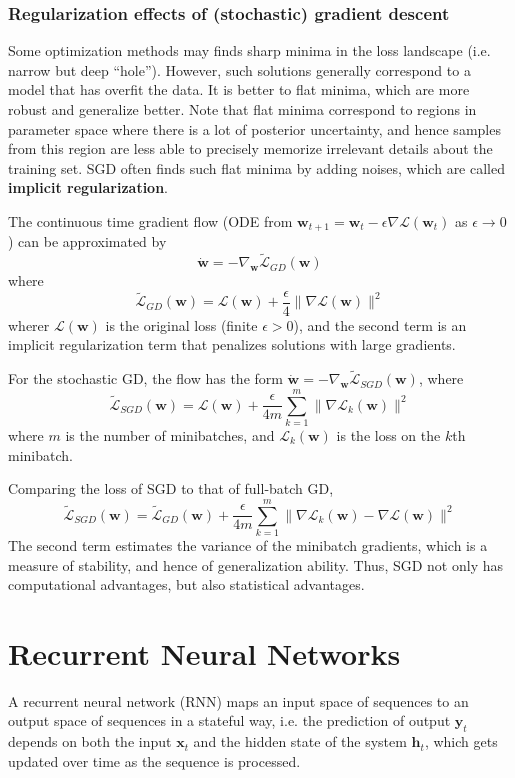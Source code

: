 \documentclass[11pt]{article}
\begin{document}
\subsubsection*{Regularization effects of (stochastic) gradient descent}

Some optimization methods may finds sharp minima in the loss landscape (i.e. narrow but deep ``hole''). 
However, such solutions generally correspond to a model that has overfit the data. 
It is better to flat minima, which are more robust and generalize better. 
Note that flat minima correspond to regions in parameter space where there is a lot of posterior uncertainty, and hence samples from this region are less able to precisely memorize irrelevant details about the training set.
SGD often finds such flat minima by adding noises, which are called \textbf{implicit regularization}.

The continuous time gradient flow (ODE from $\boldsymbol{w}_{t+1} = \boldsymbol{w}_{t} - \epsilon \nabla \mathcal{L}(\boldsymbol{w}_{t})$ as $\epsilon \to 0$) can be approximated by
\[
\dot{\boldsymbol{w}} = - \nabla_{\boldsymbol{w}} \tilde{\mathcal{L}}_{GD}(\boldsymbol{w})
\]
where
\[
\tilde{\mathcal{L}}_{GD}(\boldsymbol{w}) = \mathcal{L}(\boldsymbol{w}) + \frac{\epsilon}{4} \| \nabla \mathcal{L}(\boldsymbol{w}) \|^2
\]
wherer $\mathcal{L}(\boldsymbol{w})$ is the original loss (finite $\epsilon > 0$), and the second term is an implicit regularization term that penalizes solutions with large gradients.

For the stochastic GD, the flow has the form $\dot{\boldsymbol{w}} = - \nabla_{\boldsymbol{w}} \tilde{\mathcal{L}}_{SGD}(\boldsymbol{w})$, where 
\[
\tilde{\mathcal{L}}_{SGD}(\boldsymbol{w}) = \mathcal{L}(\boldsymbol{w}) + \frac{\epsilon}{4m} \sum_{k=1}^{m} \| \nabla \mathcal{L}_k(\boldsymbol{w}) \|^2
\]
where $m$ is the number of minibatches, and $\mathcal{L}_k(\boldsymbol{w})$ is the loss on the $k$th minibatch.

Comparing the loss of SGD to that of full-batch GD, 
\[
\tilde{\mathcal{L}}_{SGD}(\boldsymbol{w}) = \tilde{\mathcal{L}}_{GD}(\boldsymbol{w}) + \frac{\epsilon}{4m} \sum_{k=1}^{m} \| \nabla \mathcal{L}_k(\boldsymbol{w}) - \nabla \mathcal{L}(\boldsymbol{w})\|^2
\]
The second term estimates the variance of the minibatch gradients, which is a measure of stability, and hence of generalization ability.
Thus, SGD not only has computational advantages, but also statistical advantages.

\clearpage
\section{Recurrent Neural Networks}
A recurrent neural network (RNN) maps an input space of sequences to an output space of sequences in a stateful way, i.e. the prediction of output $\boldsymbol{y}_t$
depends on both the input $\boldsymbol{x}_t$ and the hidden state of the system $\boldsymbol{h}_t$, which gets updated over time as the sequence is processed.
\end{document}
